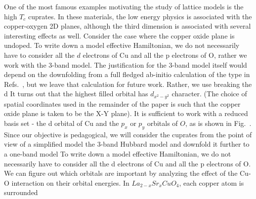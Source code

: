 \documentclass[prl,12pt,onecolumn,nofootinbib,notitlepage,english,superscriptaddress]{revtex4-1}
\newcommand{\HJC}[1]{{\color{RED}{\bf HJC: #1}}}
\begin{document}
\HJC{What is the 3 band model? Why the 3 band model??}
One of the most famous examples motivating the study of lattice models 
is the high $T_c$ cuprates. In these materials, the low energy physics is associated with the 
copper-oxygen 2D planes, although the third dimension is 
associated with several interesting effects as well. 
Consider the case where the copper oxide plane is undoped. To 
write down a model effective Hamiltonian, we do not necessarily
have to consider all the $d$ electrons of Cu and all the p
electrons of O, rather we work with the 3-band model. The justification for the 3-band model itself would depend 
on the downfolding from a full fledged ab-initio calculation of the type in Refs.~\cite{Wagner_Abbamonte,}, 
but we leave that calculation for future work.
Rather, we use breaking the d
It turns out that the highest filled orbital has $d_{x^2-y^2}$ character. (The choice of
spatial coordinates used in the remainder of the paper is such
that the copper oxide plane is taken to be the X-Y plane). It
is sufficient to work with a reduced basis set - the d orbital of
Cu and the $p_x$ or $p_y$ orbitals of $O$, as is shown in Fig.~.
Since our objective is pedagogical, we will consider the cuprates from the point of view of a simplified 
model the 3-band Hubbard model and downfold it further to a one-band model 
To
write down a model effective Hamiltonian, we do not necessarily
have to consider all the d electrons of Cu and all the p
electrons of O. We can figure out which orbitals are important
by analyzing the effect of the Cu-O interaction on their
orbital energies. In $La_{2-x}Sr_{x}CuO_4$, each copper atom is surrounded
\end{document}
